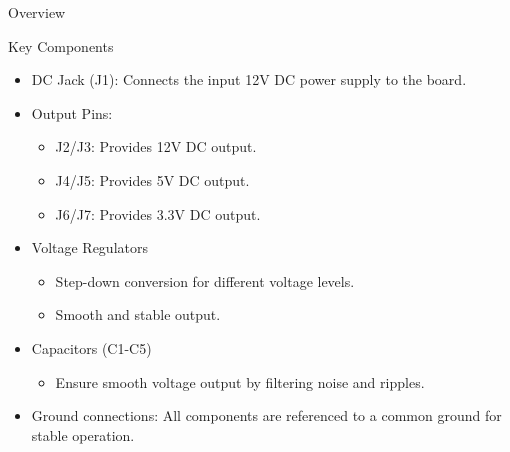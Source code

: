 \documentclass[8pt,compress]{beamer}
\begin{document}
\begin{frame}
\begin{minipage}{0.675\textwidth}
\begin{block}{Overview}
\begin{itemize}
      \end{itemize}
    \end{block}
    \begin{block}{Key Components}
      \begin{itemize}
          \footnotesize
        \item DC Jack (J1): Connects the input 12V DC power supply to the board.
        \item Output Pins:
          \begin{itemize}
              \tiny
            \item J2/J3: Provides 12V DC output.
            \item J4/J5: Provides 5V DC output.
            \item J6/J7: Provides 3.3V DC output.
          \end{itemize}
        \item Voltage Regulators
          \begin{itemize}
              \tiny
            \item Step-down conversion for different voltage levels.
            \item Smooth and stable output.
          \end{itemize}
        \item Capacitors (C1-C5)
          \begin{itemize}
              \tiny
            \item Ensure smooth voltage output by filtering noise and ripples.
          \end{itemize}
        \item Ground connections: All components are referenced to a common ground for stable operation.
      \end{itemize}
    \end{block}
  \end{minipage}
\end{frame}
\end{document}
